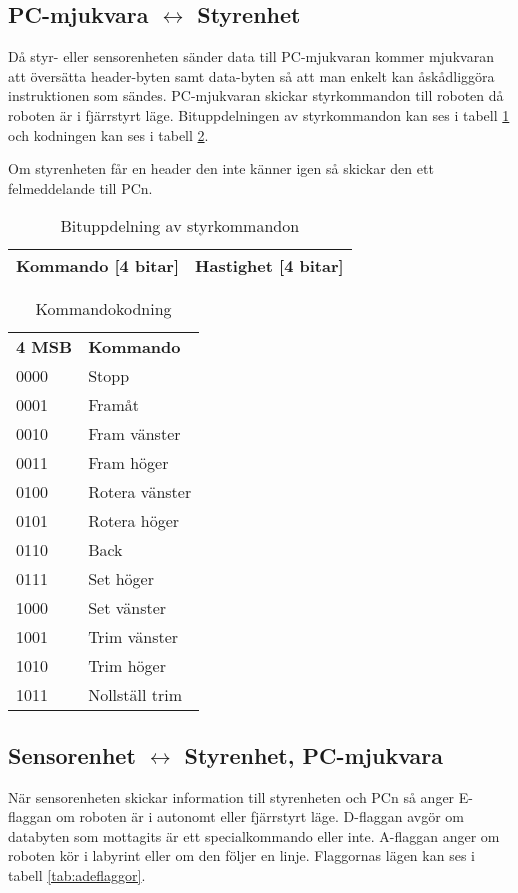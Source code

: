 \subsection{PC-mjukvara $\longleftrightarrow$ Styrenhet}
Då styr- eller sensorenheten sänder data till PC-mjukvaran kommer mjukvaran att
översätta header-byten samt data-byten så att man enkelt kan åskådliggöra
instruktionen som sändes. 
PC-mjukvaran skickar styrkommandon till roboten då roboten är i fjärrstyrt läge.
Bituppdelningen av styrkommandon kan ses i tabell \ref{tab:styrbitar} och
kodningen kan ses i tabell \ref{tab:styrkommando}.

Om styrenheten får en header den inte känner igen så skickar den ett
felmeddelande till PCn.

\begin{table}[h] 
  \centering
  \begin{tabular}{| c | c |}
    \hline
    Kommando [4 bitar] & Hastighet [4 bitar] \\ \hline
  \end{tabular}
  \caption{Bituppdelning av styrkommandon}
  \label{tab:styrbitar}
\end{table}

\begin{table}[h] 
  \centering
  \begin{tabular}{l l}
    \textbf{4 MSB} & \textbf{Kommando} \\
    0000 & Stopp \\
    0001 & Framåt \\
    0010 & Fram vänster \\
    0011 & Fram höger \\
    0100 & Rotera vänster \\
    0101 & Rotera höger \\
    0110 & Back \\
    0111 & Set höger \\
    1000 & Set vänster \\
    1001 & Trim vänster \\
    1010 & Trim höger \\
    1011 & Nollställ trim \\

  \end{tabular}
  \caption{Kommandokodning}
  \label{tab:styrkommando}
\end{table}


\subsection{Sensorenhet $\longleftrightarrow$ Styrenhet, PC-mjukvara}
När sensorenheten skickar information till styrenheten och PCn så anger
E-flaggan om roboten är i autonomt eller fjärrstyrt läge.
D-flaggan avgör om databyten som mottagits är ett specialkommando eller inte.
A-flaggan anger om roboten kör i labyrint eller om den följer en linje.
Flaggornas lägen kan ses i tabell \ref{tab:adeflaggor}.

